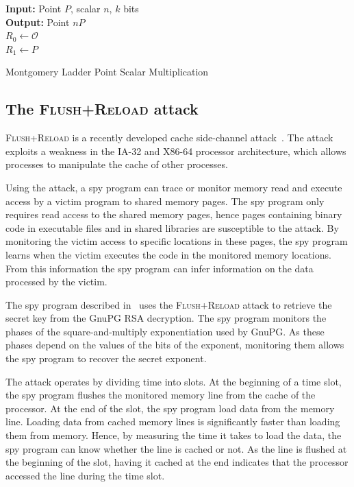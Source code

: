 \documentclass{llncs}
\begin{document}
\vspace{-0.5cm}
\begin{algorithm}[htb]\label{mont}
 \SetAlgoLined
{\bf Input:} Point $P$, scalar $n$, $k$ bits\\
{\bf Output:} Point $nP$\\
$R_0\gets \mathcal{O}$\\
$R_1\gets P$\\
 \caption{Montgomery Ladder Point Scalar Multiplication}
\end{algorithm}\vspace{-0.5cm}




\newpage

\subsection{The \textsc{Flush+Reload} attack}
\textsc{Flush+Reload} is a recently developed cache side-channel attack~\cite{yarom13flush}.
The attack exploits a weakness in the IA-32 and X86-64 processor architecture, which allows
processes to manipulate the cache of other processes.

Using the attack, a spy program can trace or monitor memory read and execute access by a victim program to shared memory pages.
The spy program only requires read access to the shared memory pages, hence pages containing binary code in executable files and
in shared libraries are susceptible to the attack.
By monitoring the victim access to specific locations in these pages, the spy program learns when the victim
executes the code in the monitored memory locations.
From this information the spy program can infer information on the data processed by the victim.

The spy program described in~\cite{yarom13flush} uses the \textsc{Flush+Reload} attack to retrieve
the secret key from the GnuPG RSA decryption.
The spy program monitors the phases of the square-and-multiply exponentiation used by GnuPG.  
As these phases depend on the values of the bits of the exponent, monitoring them
allows the spy program to recover the secret exponent.

The attack operates by dividing time into slots.  
At the beginning of a time slot, the spy program flushes the monitored memory line from the cache of the processor.
At the end of the slot, the spy program load data from the memory line.
Loading data from cached memory lines is significantly faster than loading them from memory.
Hence, by measuring the time it takes to load the data, the spy program can know whether the line is cached or not.
As the line is flushed at the beginning of the slot, having it cached at the end indicates that the processor accessed
the line during the time slot.
\end{document}
